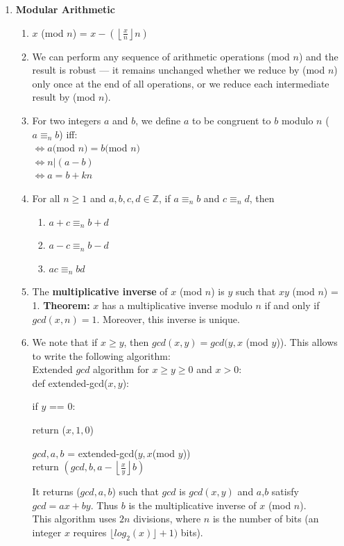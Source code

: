 \documentclass[10pt]{article}
\begin{document}
\begin{multicols}{2}
\begin{enumerate}
    \item \textbf{Modular Arithmetic} 
    \begin{enumerate}
        \item $x$ (mod $n$) = $x - (\left \lfloor{\frac{x}{n}}\right \rfloor n)$
        \item We can perform any sequence of arithmetic operations (mod $n$) and the result is robust — it remains unchanged whether we reduce by (mod $n$) only once at the end of all operations, or we reduce each intermediate result by (mod $n$).
        \item For two integers $a$ and $b$, we define $a$ to be congruent to $b$ modulo $n$ ($a \equiv_n b$) iff: \\
            $\iff a ($mod $n) = b ($mod $n)$ \\ $\iff n | (a-b)$ \\ $\iff a = b+kn$
        \item For all $n \geq 1$ and $a,b,c,d \in \mathbb{Z}$, if $a \equiv_n b$ and $c \equiv_n d$, then
        \begin{enumerate}
            \item $a + c \equiv_n b + d$
            \item $a - c \equiv_n b - d$
            \item $ac \equiv_n bd$
        \end{enumerate}
        \item The \textbf{multiplicative inverse} of $x$ (mod $n$) is $y$ such that $xy$ (mod $n$) = 1. \textbf{Theorem:} $x$ has a multiplicative inverse modulo $n$ if and only if $gcd(x,n)=1$. Moreover, this inverse is unique.
        \item We note that if $x \geq y$, then $gcd(x,y)=gcd(y, x$ (mod $y$)). This allows to write the following algorithm: \\ 
        Extended $gcd$ algorithm for $x \geq y \geq 0$ and $x > 0$: \\
        def extended-gcd($x,y$): 
        \begin{addmargin}[2em]{1em}
            if $y$ == 0:
            \begin{addmargin}[2em]{1em}
                return ($x, 1, 0$) 
            \end{addmargin}
            $gcd, a, b$ = extended-gcd($y, x $(mod $y$)) \\
            return $(gcd, b, a - \left \lfloor{\frac{x}{y}}\right \rfloor b)$
        \end{addmargin} 
        It returns ($gcd, a, b$) such that $gcd$ is $gcd(x,y)$ and $a$,$b$ satisfy $gcd = ax + by$. Thus $b$ is the multiplicative inverse of $x$ (mod $n$). \\
        This algorithm uses $2n$ divisions, where $n$ is the number of bits (an integer $x$ requires $\lfloor{log_2(x)} \rfloor+1)$ bits).
    \end{enumerate}
    

\end{enumerate}
\end{multicols}
\end{document}
